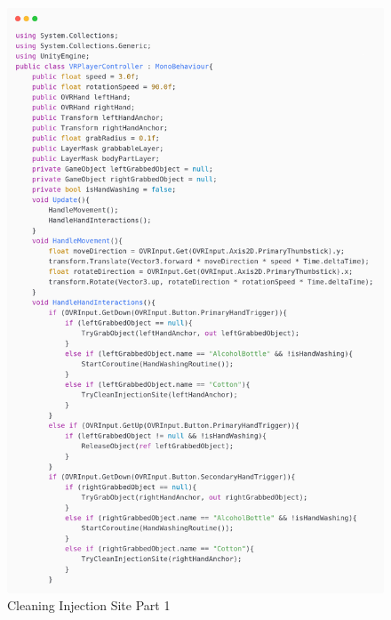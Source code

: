 \newpage
\begin{figure}[h] 
	\centering
	\includegraphics[width=1\textwidth, height=0.7\textheight]{Images/cleaning1.png}
	\caption{Cleaning Injection Site Part 1}
	\label{fig:Hands Washing}
\end{figure}
\newpage
